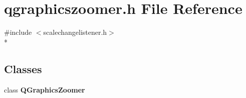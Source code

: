 \section{qgraphicszoomer.\+h File Reference}
\label{bk3_2qgraphicszoomer_8h}
{\ttfamily \#include $<$scalechangelistener.\+h$>$}\\*
\subsection*{Classes}
\begin{DoxyCompactItemize}
\item 
class {\bf Q\+Graphics\+Zoomer}
\end{DoxyCompactItemize}

